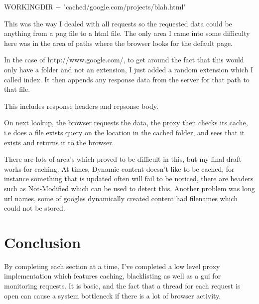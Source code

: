 \documentclass{article}
\begin{document}
WORKING\textunderscore DIR + "cached/google.com/projects/blah.html"



This was the way I dealed with all requests so the requested data could be anything from a png file to a html file. The only area I came into some difficulty here was in the area of paths where the browser looks for the default page.



In the case of http://www.google.com/, to get around the fact that this would only have a folder and not an extension, I just added a random extension which I called index. It then appends any response data from the server for that path to that file.



This includes response headers and repsonse body.



On next lookup, the browser requests the data, the proxy then checks its cache, i.e does a file exists query on the location in the cached folder, and sees that it exists and returns it to the browser.



There are lots of area's which proved to be difficult in this, but my final draft works for caching. At times, Dynamic content doesn't like to be cached, for instance something that is updated often will fail to be noticed, there are headers such as Not-Modified which can be used to detect this. Another problem was long url names, some of googles dynamically created content had filenames which could not be stored. 



\section*{ Conclusion}


By completing each section at a time, I've completed a low level proxy implementation which features caching, blacklisting as well as a gui for monitoring requests. It is basic, and the fact that a thread for each request is open can cause a system bottleneck if there is a lot of browser activity. 
\end{document}
